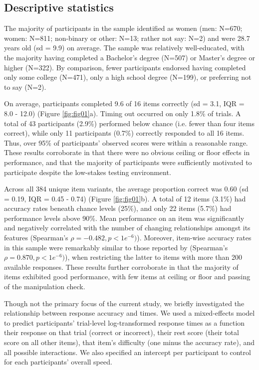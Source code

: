\documentclass[a4paper,man,natbib]{apa6}
\begin{document}
\subsection{Descriptive statistics}

The majority of participants in the sample identified as women (men: N=670; women: N=811; non-binary or other: N=13; rather not say: N=2) and were 28.7 years old (sd = 9.9) on average. The sample was relatively well-educated, with the majority having completed a Bachelor's degree (N=507) or Master's degree or higher (N=322). By comparison, fewer participants endorsed having completed only some college (N=471), only a high school degree (N=199), or preferring not to say (N=2). 

On average, participants completed 9.6 of 16 items correctly (sd = 3.1, IQR = 8.0 - 12.0) (Figure \ref{fig:fig01}a). Timing out occurred on only 1.8\% of trials. A total of 43 participants (2.9\%) performed below chance (i.e. fewer than four items correct), while only 11 participants (0.7\%) correctly responded to all 16 items. Thus, over 95\% of participants' observed scores were within a reasonable range. These results corroborate \cite{chierchia2019matrix} in that there were no obvious ceiling or floor effects in performance, and that the majority of participants were sufficiently motivated to participate despite the low-stakes testing environment.  

Across all 384 unique item variants, the average proportion correct was 0.60 (sd = 0.19, IQR = 0.45 - 0.74) (Figure \ref{fig:fig01}b). A total of 12 items (3.1\%) had accuracy rates beneath chance levels (25\%), and only 22 items (5.7\%) had performance levels above 90\%. Mean performance on an item was significantly and negatively correlated with the number of changing relationships amongst its features (Spearman's $\rho = -0.482, p < 1e^{-6})$). Moreover, item-wise accuracy rates in this sample were remarkably similar to those reported by \cite{chierchia2019matrix} (Spearman's $\rho = 0.870, p < 1e^{-6})$), when restricting the latter to items with more than 200 available responses. These results further corroborate \cite{chierchia2019matrix} in that the majority of items exhibited good performance, with few items at ceiling or floor and passing of the manipulation check. 

Though not the primary focus of the current study, we briefly investigated the relationship between response accuracy and times. We used a mixed-effects model to predict participants' trial-level log-transformed response times as a function their response on that trial (correct or incorrect), their rest score (their total score on all other items), that item's difficulty (one minus the accuracy rate), and all possible interactions. We also specified an intercept per participant to control for each participants' overall speed. 
\end{document}
